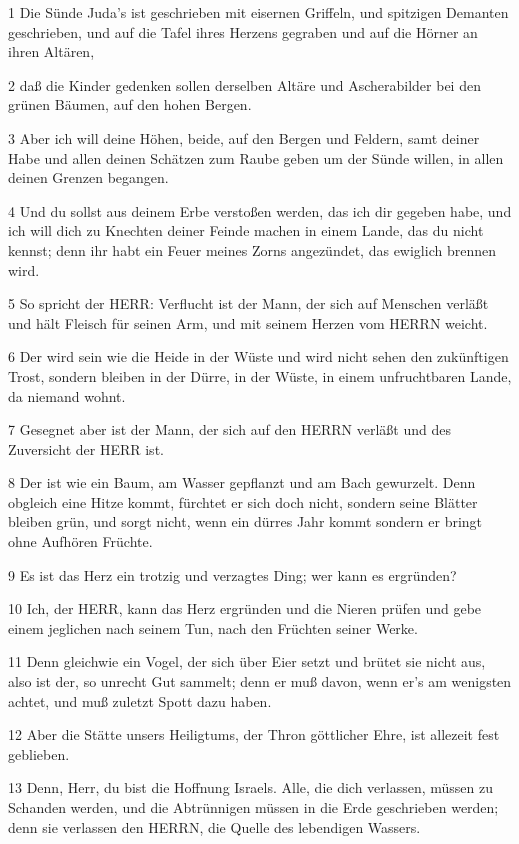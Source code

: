 \par 1 Die Sünde Juda's ist geschrieben mit eisernen Griffeln, und spitzigen Demanten geschrieben, und auf die Tafel ihres Herzens gegraben und auf die Hörner an ihren Altären,
\par 2 daß die Kinder gedenken sollen derselben Altäre und Ascherabilder bei den grünen Bäumen, auf den hohen Bergen.
\par 3 Aber ich will deine Höhen, beide, auf den Bergen und Feldern, samt deiner Habe und allen deinen Schätzen zum Raube geben um der Sünde willen, in allen deinen Grenzen begangen.
\par 4 Und du sollst aus deinem Erbe verstoßen werden, das ich dir gegeben habe, und ich will dich zu Knechten deiner Feinde machen in einem Lande, das du nicht kennst; denn ihr habt ein Feuer meines Zorns angezündet, das ewiglich brennen wird.
\par 5 So spricht der HERR: Verflucht ist der Mann, der sich auf Menschen verläßt und hält Fleisch für seinen Arm, und mit seinem Herzen vom HERRN weicht.
\par 6 Der wird sein wie die Heide in der Wüste und wird nicht sehen den zukünftigen Trost, sondern bleiben in der Dürre, in der Wüste, in einem unfruchtbaren Lande, da niemand wohnt.
\par 7 Gesegnet aber ist der Mann, der sich auf den HERRN verläßt und des Zuversicht der HERR ist.
\par 8 Der ist wie ein Baum, am Wasser gepflanzt und am Bach gewurzelt. Denn obgleich eine Hitze kommt, fürchtet er sich doch nicht, sondern seine Blätter bleiben grün, und sorgt nicht, wenn ein dürres Jahr kommt sondern er bringt ohne Aufhören Früchte.
\par 9 Es ist das Herz ein trotzig und verzagtes Ding; wer kann es ergründen?
\par 10 Ich, der HERR, kann das Herz ergründen und die Nieren prüfen und gebe einem jeglichen nach seinem Tun, nach den Früchten seiner Werke.
\par 11 Denn gleichwie ein Vogel, der sich über Eier setzt und brütet sie nicht aus, also ist der, so unrecht Gut sammelt; denn er muß davon, wenn er's am wenigsten achtet, und muß zuletzt Spott dazu haben.
\par 12 Aber die Stätte unsers Heiligtums, der Thron göttlicher Ehre, ist allezeit fest geblieben.
\par 13 Denn, Herr, du bist die Hoffnung Israels. Alle, die dich verlassen, müssen zu Schanden werden, und die Abtrünnigen müssen in die Erde geschrieben werden; denn sie verlassen den HERRN, die Quelle des lebendigen Wassers.

